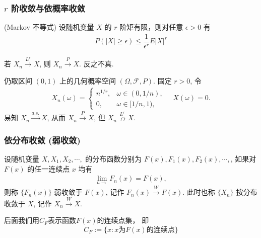 \begin{frame}
	\frametitle{$r$ 阶收敛与依概率收敛}
	\begin{lem}
		({\rm Markov} 不等式) 设随机变量 $X$ 的 $r$ 阶矩有限，则对任意 $\epsilon>0$ 有
		\begin{eqnarray*}
			P(|X|\geq  \epsilon)\leq \dfrac{1}{\epsilon^r}E|X|^r
		\end{eqnarray*}

	\end{lem}


	\pause
	\begin{thm}
		若 $X_n\stackrel{L^r}{\rightarrow} X$, 则 $X_n\stackrel{P}{\rightarrow} X$. 反之不真.
	\end{thm}


	\pause

	\begin{exam}
		仍取区间 $(0,1)$ 上的几何概率空间 $(\Omega,\mathcal{F}, P)$. 固定 $r>0$, 令
		\begin{eqnarray*}
			X_n(\omega)=\left\{
			\begin{array}{ll}
				n^{1/r},&\omega\in (0, 1/n),\\
				0, &\omega\in [1/n,1),
			\end{array}
			\right. \quad X(\omega)=0.
		\end{eqnarray*}
		易知 $X_n\stackrel{a.s.}{\rightarrow} X$, 从而 $X_n\stackrel{P}{\rightarrow} X$, 但 $X_n\stackrel{L^r}{\nrightarrow} X$.
	\end{exam}
\end{frame}




\begin{frame}
	\frametitle{依分布收敛 (弱收敛)}
	\begin{defi}
		设随机变量 $X,X_1, X_2,\cdots,$ 的分布函数分别为 $F (x), F_1 (x),F_2 (x),\cdots,$, 如果对 $F (x)$ 的任一连续点 $x$ 均有
		\begin{eqnarray*}
			\lim_{n\rightarrow}F_n(x)=F(x),
		\end{eqnarray*}
		则称 $\{F_n (x)\}$ 弱收敛于 $F (x)$, 记作 $F_n (x)\stackrel{W}{\rightarrow} F (x)$. 此时也称 $\{X_n\}$ 按分布收敛于 $X$, 记作 $X_n\stackrel{W}{\rightarrow} X$.
	\end{defi}
	\pause
	\begin{rmk}
	后面我们用$C_F$表示函数$F(x)$的连续点集， 即
	\[C_F:=\{x: x\mbox{为}F(x)\mbox{的连续点}  \}\]
	\end{rmk}

\end{frame}

